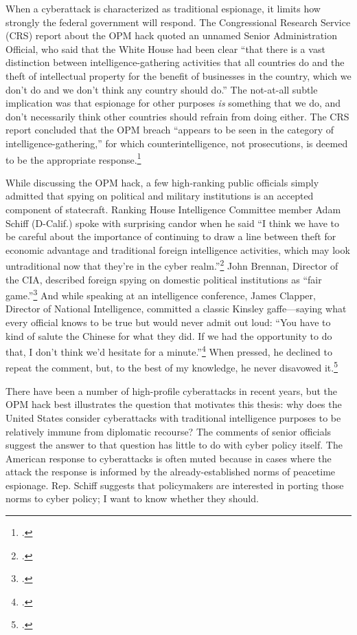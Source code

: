 \documentclass[11pt]{memoir}
\begin{document}
\begin{refsegment}
When a cyberattack is characterized as traditional espionage, it limits how strongly the federal government will respond. The Congressional Research Service (CRS) report about the OPM hack quoted an unnamed Senior Administration Official, who said that the White House had been clear ``that there is a vast distinction between intelligence-gathering activities that all countries do and the theft of intellectual property for the benefit of businesses in the country, which we don't do and we don't think any country should do.'' The not-at-all subtle implication was that espionage for other purposes \emph{is} something that we do, and don't necessarily think other countries should refrain from doing either. The CRS report concluded that the OPM breach ``appears to be seen in the category of intelligence-gathering,'' for which counterintelligence, not prosecutions, is deemed to be the appropriate response.\footcite{finklea_cyber_2015}

While discussing the OPM hack, a few high-ranking public officials simply admitted that spying on political and military institutions is an accepted component of statecraft. Ranking House Intelligence Committee member Adam Schiff (D-Calif.) spoke with surprising candor when he said ``I think we have to be careful about the importance of continuing to draw a line between theft for economic advantage and traditional foreign intelligence activities, which may look untraditional now that they’re in the cyber realm.''\footcite{nakashima_hacks_2015} John Brennan, Director of the CIA, described foreign spying on domestic political institutions as ``fair game.''\footcite{sanger_u.s._2016} And while speaking at an intelligence conference, James Clapper, Director of National Intelligence, committed a classic Kinsley gaffe---saying what every official knows to be true but would never admit out loud: ``You have to kind of salute the Chinese for what they did. If we had the opportunity to do that, I don't think we'd hesitate for a minute.''\footcite{pepitone_clapper_2015} When pressed, he declined to repeat the comment, but, to the best of my knowledge, he never disavowed it.\footcite{sanger_u.s._2015}

There have been a number of high-profile cyberattacks in recent years, but the OPM hack best illustrates the question that motivates this thesis: why does the United States consider cyberattacks with traditional intelligence purposes to be relatively immune from diplomatic recourse? The comments of senior officials suggest the answer to that question has little to do with cyber policy itself. The American response to cyberattacks is often muted because in cases where the attack the response is informed by the already-established norms of peacetime espionage. Rep. Schiff suggests that policymakers are interested in porting those norms to cyber policy; I want to know whether they should.


\end{refsegment}
\end{document}
